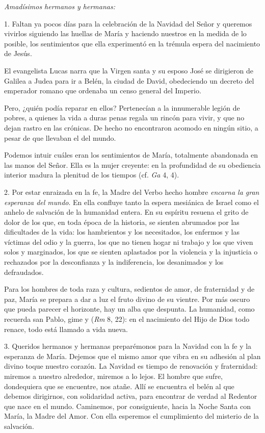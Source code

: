 				\begin{body}
					\emph{Amadísimos hermanos y hermanas:}
					
					1. Faltan ya pocos días para la celebración de la Navidad del Señor y queremos vivirlos siguiendo las huellas de María y haciendo nuestros en la medida de lo posible, los sentimientos que ella experimentó en la trémula espera del nacimiento de Jesús.
					
					El evangelista Lucas narra que la Virgen santa y su esposo José se dirigieron de Galilea a Judea para ir a Belén, la ciudad de David, obedeciendo un decreto del emperador romano que ordenaba un censo general del Imperio.
					
					Pero, ¿quién podía reparar en ellos? Pertenecían a la innumerable legión de pobres, a quienes la vida a duras penas regala un rincón para vivir, y que no dejan rastro en las crónicas. De hecho no encontraron acomodo en ningún sitio, a pesar de que llevaban el  del mundo.
					
					Podemos intuir cuáles eran los sentimientos de María, totalmente abandonada en las manos del Señor. Ella es la mujer creyente: en la profundidad de su obediencia interior madura la plenitud de los tiempos (cf. \emph{Ga} 4, 4).
					
					2. Por estar enraizada en la fe, la Madre del Verbo hecho hombre \emph{encarna la gran esperanza del mundo}. En ella confluye tanto la espera mesiánica de Israel como el anhelo de salvación de la humanidad entera. En su espíritu resuena el grito de dolor de los que, en toda época de la historia, se sienten abrumados por las dificultades de la vida: los hambrientos y los necesitados, los enfermos y las víctimas del odio y la guerra, los que no tienen hogar ni trabajo y los que viven solos y marginados, los que se sienten aplastados por la violencia y la injusticia o rechazados por la desconfianza y la indiferencia, los desanimados y los defraudados.
					
					Para los hombres de toda raza y cultura, sedientos de amor, de fraternidad y de paz, María se prepara a dar a luz el fruto divino de su vientre. Por más oscuro que pueda parecer el horizonte, hay un alba que despunta. La humanidad, como recuerda san Pablo, gime y  (\emph{Rm} 8, 22): en el nacimiento del Hijo de Dios todo renace, todo está llamado a vida nueva.
					
					3. Queridos hermanos y hermanas preparémonos para la Navidad con la fe y la esperanza de María. Dejemos que el mismo amor que vibra en su adhesión al plan divino toque nuestro corazón. La Navidad es tiempo de renovación y fraternidad: miremos a nuestro alrededor, miremos a lo lejos. El hombre que sufre, dondequiera que se encuentre, nos atañe. Allí se encuentra el belén al que debemos dirigirnos, con solidaridad activa, para encontrar de verdad al Redentor que nace en el mundo. Caminemos, por consiguiente, hacia la Noche Santa con María, la Madre del Amor. Con ella esperemos el cumplimiento del misterio de la salvación.
				\end{body}

